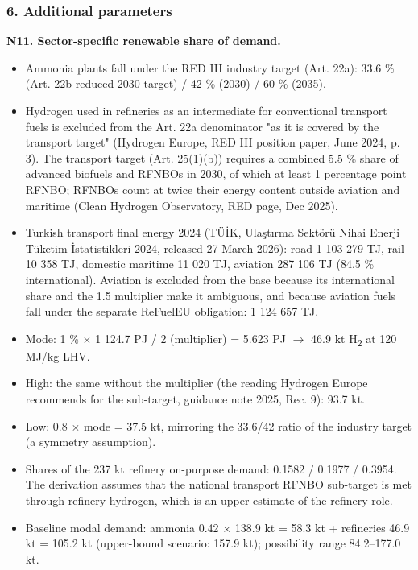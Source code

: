 \documentclass[11pt,a4paper]{article}
\begin{document}
\subsubsection{6. Additional parameters}

\textbf{N11. Sector-specific renewable share of demand.}

\begin{itemize}\setlength\itemsep{1pt}

  \item Ammonia plants fall under the RED III industry target (Art. 22a): 33.6 \% (Art. 22b reduced 2030 target) / 42 \% (2030) / 60 \% (2035).

  \item Hydrogen used in refineries as an intermediate for conventional transport fuels is excluded from the Art. 22a denominator "as it is covered by the transport target" (Hydrogen Europe, RED III position paper, June 2024, p. 3). The transport target (Art. 25(1)(b)) requires a combined 5.5 \% share of advanced biofuels and RFNBOs in 2030, of which at least 1 percentage point RFNBO; RFNBOs count at twice their energy content outside aviation and maritime (Clean Hydrogen Observatory, RED page, Dec 2025).

  \item Turkish transport final energy 2024 (TÜİK, Ulaştırma Sektörü Nihai Enerji Tüketim İstatistikleri 2024, released 27 March 2026): road 1 103 279 TJ, rail 10 358 TJ, domestic maritime 11 020 TJ, aviation 287 106 TJ (84.5 \% international). Aviation is excluded from the base because its international share and the 1.5 multiplier make it ambiguous, and because aviation fuels fall under the separate ReFuelEU obligation: 1 124 657 TJ.

  \item Mode: 1 \% $\times$ 1 124.7 PJ / 2 (multiplier) = 5.623 PJ $\rightarrow$ 46.9 kt H\textsubscript{2} at 120 MJ/kg LHV.

  \item High: the same without the multiplier (the reading Hydrogen Europe recommends for the sub-target, guidance note 2025, Rec. 9): 93.7 kt.

  \item Low: 0.8 $\times$ mode = 37.5 kt, mirroring the 33.6/42 ratio of the industry target (a symmetry assumption).

  \item Shares of the 237 kt refinery on-purpose demand: 0.1582 / 0.1977 / 0.3954. The derivation assumes that the national transport RFNBO sub-target is met through refinery hydrogen, which is an upper estimate of the refinery role.

  \item Baseline modal demand: ammonia 0.42 $\times$ 138.9 kt = 58.3 kt + refineries 46.9 kt = 105.2 kt (upper-bound scenario: 157.9 kt); possibility range 84.2--177.0 kt.

\end{itemize}
\end{document}
